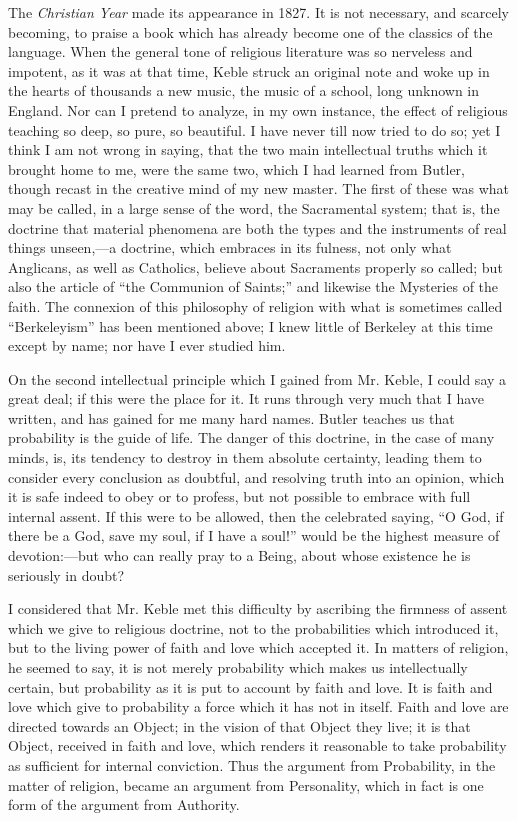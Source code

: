 The \emph{Christian Year} made its appearance in 1827. It is not
necessary, and scarcely becoming, to praise a book which has already
become one of the classics of the language. When the general tone of
religious literature was so nerveless and impotent, as it was at that
time, Keble struck an original note and woke up in the hearts of
thousands a new music, the music of a school, long unknown in England.
Nor can I pretend to analyze, in my own instance, the effect of
religious teaching so deep, so pure, so beautiful. I have never till
now tried to do so; yet I think I am not wrong in saying, that the two
main intellectual truths which it brought home to me, were the same
two, which I had learned from Butler, though recast in the creative
mind of my new master. The first of these was what may be called, in a
large sense of the word, the Sacramental system; that is, the doctrine
that material phenomena are both the types and the instruments of real
things unseen,—a doctrine, which embraces in its fulness,
not only what Anglicans, as well as Catholics, believe about
Sacraments properly so called; but also the article of ``the
Communion of Saints;'' and likewise the
Mysteries of the faith. The connexion of this philosophy of religion
with what is sometimes called ``Berkeleyism'' has been
mentioned above; I knew little of Berkeley at this time except by
name; nor have I ever studied him.

On the second intellectual principle which I gained from Mr. Keble,
I could say a great deal; if this were the place for it. It runs
through very much that I have written, and has gained for me
many hard names. Butler teaches us that probability is the guide of
life. The danger of this doctrine, in the case of many minds, is, its
tendency to destroy in them absolute certainty, leading them to
consider every conclusion as doubtful, and resolving truth into an
opinion, which it is safe indeed to obey or to profess, but
not possible to embrace with full internal assent. If this were to be
allowed, then the celebrated saying, ``O God, if there be a God,
save my soul, if I have a soul!'' would be the highest measure of
devotion:—but who can really pray to a Being, about whose existence
he is seriously in doubt?

I considered that Mr. Keble met this difficulty by ascribing the
firmness of assent which we give to religious doctrine, not to the
probabilities which introduced it, but to the living power of faith
and love which accepted it. In matters of religion, he seemed to say,
it is not merely probability which makes us intellectually certain,
but probability as it is put to account by faith and love. It is faith
and love which give to probability a force which it has not in itself.
Faith and love are directed towards an Object; in the vision of that
Object they live; it is that Object, received in faith and love, which
renders it reasonable to take probability as sufficient for internal
conviction. Thus the argument from Probability, in the matter of religion, became an argument
from Personality, which in fact is one form of the argument from
Authority.

